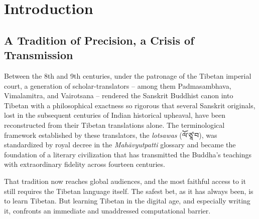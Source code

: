 \documentclass[11pt]{article}
\newcommand{\tib}[1]{{\fontspec{Jomolhari}#1}}
\begin{document}
\begin{abstract}
The reference implementation, \textbf{Lotsawa}, is released as a shared Swift package with iOS, macOS, and Android host integrations. On 20{,}000 held-out sentence-level queries the full hybrid pipeline reaches 52.4\% top-1 and 71.7\% top-5 accuracy; a frequency-only dictionary baseline reaches 21.4\% and 28.1\%, and an n-gram-only baseline 24.6\% and 28.4\%. Statistical disambiguation is therefore responsible for an absolute 31 percentage-point improvement in top-1 accuracy, confirming empirically that the Lotsawa Standard is practical only in the presence of a trained language model. The BiLSTM component contains 877{,}096 parameters and compiles to a 3.45\,MB CoreML artifact; the shipping iOS keyboard extension runs the complete pipeline locally without cloud connectivity. The necessity of a specialized architecture for this language is further supported by the TLUE benchmark~\cite{tlue2025}, which shows that general-purpose large language models perform at or below the random baseline on Tibetan language understanding tasks.
\end{abstract}

\section{Introduction}
\label{sec:intro}

\subsection{A Tradition of Precision, a Crisis of Transmission}

Between the 8th and 9th centuries, under the patronage of the Tibetan imperial court, a generation of scholar-translators -- among them Padmasambhava, Vimalamitra, and Vairotsana -- rendered the Sanskrit Buddhist canon into Tibetan with a philosophical exactness so rigorous that several Sanskrit originals, lost in the subsequent centuries of Indian historical upheaval, have been reconstructed from their Tibetan translations alone. The terminological framework established by these translators, the \emph{lotsawas} (\tib{ལོ་ཙཱ་བ}), was standardized by royal decree in the \emph{Mahāvyutpatti} glossary and became the foundation of a literary civilization that has transmitted the Buddha's teachings with extraordinary fidelity across fourteen centuries.

That tradition now reaches global audiences, and the most faithful access to it still requires the Tibetan language itself. The safest bet, as it has always been, is to learn Tibetan. But learning Tibetan in the digital age, and especially writing it, confronts an immediate and unaddressed computational barrier.
\end{document}
